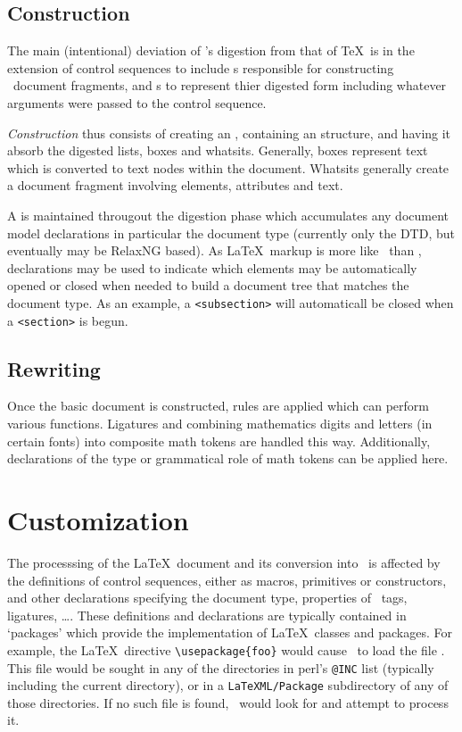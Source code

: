 \documentclass{report}
\begin{document}
\section{Construction}\label{architecture.construction}
The main (intentional) deviation of \LaTeXML's digestion from that of \TeX\ is in the
extension of control sequences to include s responsible for constructing
\XML\ document fragments, and s to represent thier digested form including
whatever arguments were passed to the control sequence.

\emph{Construction} thus consists of creating an , containing
an  structure, and having it absorb the digested lists, boxes
and whatsits.  Generally, boxes represent text which is converted to text nodes within the
document. Whatsits generally create a document fragment involving elements, attributes
and text.  

A  is maintained througout the digestion phase which accumulates
any document model declarations in particular the document type (currently only
the DTD, but eventually may be RelaxNG based).  As \LaTeX\ markup is more
like \SGML\ than \XML, declarations may be used to indicate which elements may
be automatically opened or closed when needed to build a document tree that matches
the document type.  As an example, a \verb|<subsection>| will automaticall be closed
when a \verb|<section>| is begun.

\section{Rewriting}\label{architecture.rewriting}
Once the basic document is constructed,  rules are applied which can
perform various functions. Ligatures and combining mathematics digits and letters (in certain fonts)
into composite math tokens are handled this way.  Additionally, declarations
of the type or grammatical role of math tokens can be applied here.


\chapter{Customization}\label{customization}
The processsing of the \LaTeX\ document and its  conversion into \XML\ is affected
by the definitions of control sequences, either as macros, primitives or constructors, 
and other declarations specifying the document type, properties of \XML\ tags, ligatures, \ldots.
These definitions and declarations are typically contained in `packages' which provide
the implementation of \LaTeX\ classes and packages.  For example, the \LaTeX\ directive
\verb|\usepackage{foo}| would cause \LaTeXML\ to load the file .
This file would be sought in any of the directories in perl's \verb|@INC| list (typically
including the current directory), or in a \verb|LaTeXML/Package| subdirectory of any of 
those directories.  If no such file is found, \LaTeXML\ would look for  and
attempt to process it.
\end{document}

